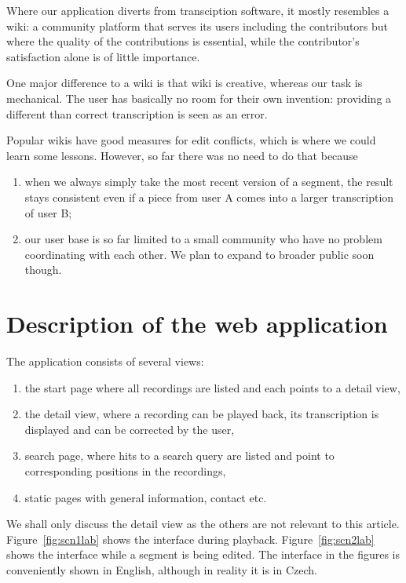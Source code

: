 \documentclass{svproc}
\begin{document}
Where our application diverts from transciption software, it mostly resembles a
wiki: a community platform that serves its users including the contributors but
where the quality of the contributions is essential, while the contributor's
satisfaction alone is of little importance.

One major difference to a wiki is that wiki is creative, whereas our task is
mechanical. The user has basically no room for their own invention: providing a
different than correct transcription is seen as an error.

Popular wikis have good measures for edit conflicts, which is where we could
learn some lessons. However, so far there was no need to do that because
\begin{enumerate}
\item{when we always simply take the most recent version
of a segment, the result stays consistent even if a piece from user A comes into
a larger transcription of user B;}
\item{our user base is so far limited to a small community who have no problem
coordinating with each other. We plan to expand to broader public soon though.}
\end{enumerate}

\section{Description of the web application}

The application consists of several views:
\begin{enumerate}
\item{the start page where all recordings are listed and each points to a detail
view,}
\item{the detail view, where a recording can be played back, its transcription
is displayed and can be corrected by the user,}
\item{search page, where hits to a search query are listed and point to
corresponding positions in the recordings,}
\item{static pages with general information, contact etc.}
\end{enumerate}

We shall only discuss the detail view as the others are not relevant to this
article. Figure~\ref{fig:scn1lab} shows the interface during playback.
Figure~\ref{fig:scn2lab} shows the interface while a segment is being edited.
The interface in the figures is conveniently shown in English, although in
reality it is in Czech.
\end{document}
